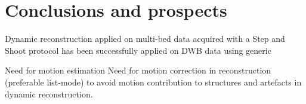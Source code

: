 \chapter*{Conclusions and prospects}
Dynamic reconstruction applied on multi-bed data acquired with a Step and Shoot protocol has been successfully applied on DWB data using generic 

Need for motion estimation 
Need for motion correction in reconstruction (preferable list-mode) to avoid motion contribution to structures and artefacts in dynamic reconstruction. 